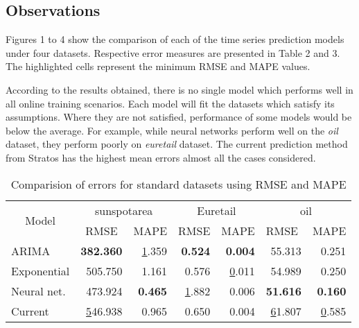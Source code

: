 \subsection{Observations}

Figures 1 to 4 show the comparison of each of the time series prediction models under four datasets. Respective error measures are presented in Table 2 and 3. The highlighted cells represent the minimum RMSE and MAPE values. 

According to the results obtained, there is no single model which performs well in all online training scenarios. Each model will fit the datasets which satisfy its assumptions. Where they are not satisfied, performance of some models would be below the average. For example, while neural networks perform well on the \textit{oil} dataset, they perform poorly on \textit{euretail} dataset. The current prediction method from Stratos has the highest mean errors almost all the cases considered.

\begin{table}[]
\centering
\caption{ Comparision of errors for standard datasets using RMSE and MAPE}
\label{my-label}
\begin{tabular}{|l|r|r|r|r|r|r|}
\hline
\multicolumn{1}{|c|}{\multirow{2}{*}{Model}} & \multicolumn{2}{c|}{sunspotarea}                      & \multicolumn{2}{c|}{Euretail}                         & \multicolumn{2}{c|}{oil}                              \\ \cline{2-7} 
\multicolumn{1}{|c|}{}                       & \multicolumn{1}{c|}{RMSE} & \multicolumn{1}{c|}{MAPE} & \multicolumn{1}{c|}{RMSE} & \multicolumn{1}{c|}{MAPE} & \multicolumn{1}{l|}{RMSE} & \multicolumn{1}{l|}{MAPE} \\ \hline
ARIMA                                        & \textbf{382.360}          & {\ul 1.359}               & \textbf{0.524}            & \textbf{0.004}            & 55.313                    & 0.251                     \\ \hline
Exponential                                  & 505.750                   & 1.161                     & 0.576                     & {\ul 0.011}               & 54.989                    & 0.250                     \\ \hline
Neural net.                                  & 473.924                   & \textbf{0.465}            & {\ul 1.882}               & 0.006                     & \textbf{51.616}           & \textbf{0.160}            \\ \hline
Current                                      & {\ul 546.938}             & 0.965                     & 0.650                     & 0.004                     & {\ul 61.807}              & {\ul 0.585}               \\ \hline
\end{tabular}
\end{table}

